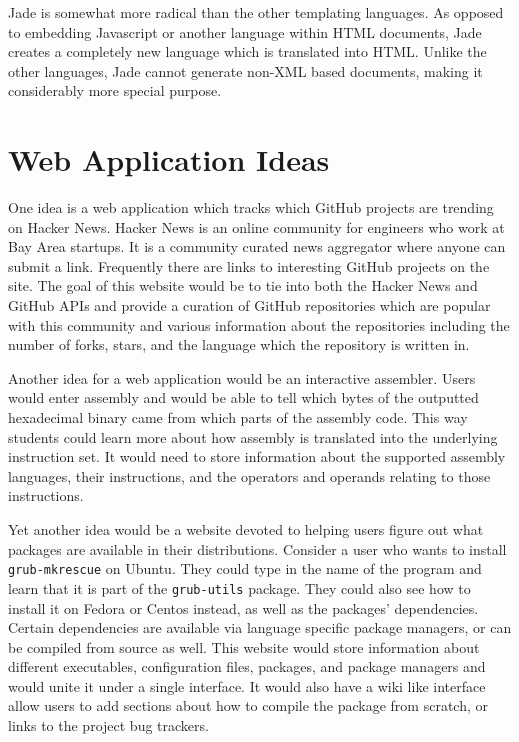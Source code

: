 \documentclass[12pt]{article}
\begin{document}
Jade is somewhat more radical than the other templating languages. As opposed to embedding Javascript or another language within HTML documents, Jade creates a completely new language which is translated into HTML. Unlike the other languages, Jade cannot generate non-XML based documents, making it considerably more special purpose.

\section{Web Application Ideas}
One idea is a web application which tracks which GitHub projects are trending on Hacker News. Hacker News is an online community for engineers who work at Bay Area startups. It is a community curated news aggregator where anyone can submit a link. Frequently there are links to interesting GitHub projects on the site. The goal of this website would be to tie into both the Hacker News and GitHub APIs and provide a curation of GitHub repositories which are popular with this community and various information about the repositories including the number of forks, stars, and the language which the repository is written in.

Another idea for a web application would be an interactive assembler. Users would enter assembly and would be able to tell which bytes of the outputted hexadecimal binary came from which parts of the assembly code. This way students could learn more about how assembly is translated into the underlying instruction set.  It would need to store information about the supported assembly languages, their instructions, and the operators and operands relating to those instructions.

Yet another idea would be a website devoted to helping users figure out what packages are available in their distributions. Consider a user who wants to install \texttt{grub-mkrescue} on Ubuntu. They could type in the name of the program and learn that it is part of the \texttt{grub-utils} package. They could also see how to install it on Fedora or Centos instead, as well as the packages' dependencies. Certain dependencies are available via language specific package managers, or can be compiled from source as well. This website would store information about different executables, configuration files, packages, and package managers and would unite it under a single interface. It would also have a wiki like interface allow users to add sections about how to compile the package from scratch, or links to the project bug trackers.
\end{document}
